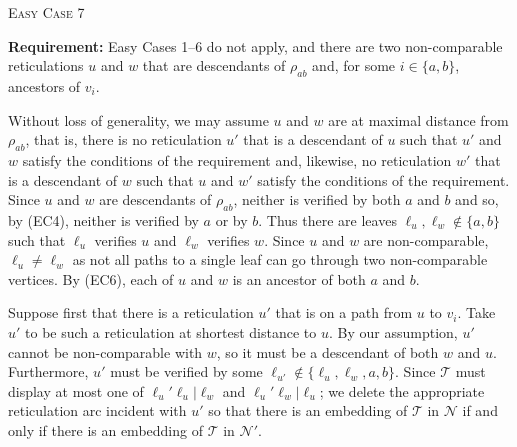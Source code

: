 \documentclass[11pt]{amsart}
\begin{document}
\begin{algorithm}[H]
 \caption{\textsc{Easy Case 7}}
\begin{algorithmic}[1]
 \Statex\textbf{Requirement:} Easy Cases 1--6 do not apply, and there are two non-comparable reticulations $u$ and $w$ that are descendants of $\rho_{ab}$ and, for some $i\in \{a, b\}$, ancestors of $v_i$.
        \Else
        \EndIf
        \Else
        \Else
        \EndIf
        \EndIf
 \end{algorithmic}
\end{algorithm}
Without loss of generality, we may assume $u$ and $w$ are at maximal distance from $\rho_{ab}$, that is, there is no reticulation $u'$ that is a descendant of $u$ such that $u'$ and $w$ satisfy the conditions of the requirement and, likewise, no reticulation $w'$ that is a descendant of $w$ such that $u$ and $w'$ satisfy the conditions of the requirement. Since $u$ and $w$ are descendants of $\rho_{ab}$, neither is verified by both $a$ and $b$ and so, by (EC4), neither is verified by $a$ or by $b$. Thus there are leaves $\ell_u,\ell_w\not\in \{a, b\}$ such that $\ell_u$ verifies $u$ and $\ell_w$ verifies $w$. Since $u$ and $w$ are non-comparable, $\ell_u\neq \ell_w$ as not all paths to a single leaf can go through two non-comparable vertices. By (EC6), each of $u$ and $w$ is an ancestor of both $a$ and $b$. 

Suppose first that there is a reticulation $u'$ that is on a path from $u$ to $v_i$. Take $u'$ to be such a reticulation at shortest distance to $u$. By our assumption, $u'$ cannot be non-comparable with $w$, so it must be a descendant of both $w$ and $u$. Furthermore, $u'$ must be verified by some $\ell_{u'}\not\in \{\ell_u,\ell_w,a, b\}$. Since ${{\mathcal T}}$ must display at most one of $\ell_u'\ell_u|\ell_w$ and $\ell_u'\ell_w|\ell_u$; we delete the appropriate reticulation arc incident with $u'$ so that there is an embedding of ${{\mathcal T}}$ in ${{\mathcal N}}$ if and only if there is an embedding of ${{\mathcal T}}$ in ${{\mathcal N}}'$.
\end{document}

